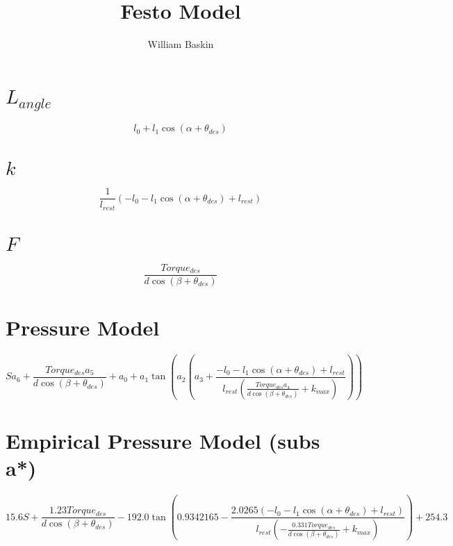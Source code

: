 \documentclass[12pt, letterpaper, oneside, notitlepage, onecolumn]{article}
\author{William Baskin}
\title{Festo Model}
\begin{document}
\maketitle

\section{$L_{angle}$}
\begin{equation}
l_{0} + l_{1} \cos{\left (\alpha + \theta_{des} \right )}
\end{equation}

\section{$k$}
\begin{equation}
\frac{1}{l_{rest}} \left(- l_{0} - l_{1} \cos{\left (\alpha + \theta_{des}
\right )} + l_{rest}\right)
\end{equation}

\section{$F$}
\begin{equation}
\frac{Torque_{des}}{d \cos{\left (\beta + \theta_{des} \right )}}
\end{equation}

\section{Pressure Model}
\begin{equation}
S a_{6} + \frac{Torque_{des} a_{5}}{d \cos{\left (\beta + \theta_{des} \right
)}} + a_{0} + a_{1} \tan{\left (a_{2} \left(a_{3} + \frac{- l_{0} - l_{1}
\cos{\left (\alpha + \theta_{des} \right )} + l_{rest}}{l_{rest}
\left(\frac{Torque_{des} a_{4}}{d \cos{\left (\beta + \theta_{des} \right )}} +
k_{max}\right)}\right) \right )}
\end{equation}

\section{Empirical Pressure Model (subs a*)}
\begin{equation}
15.6 S + \frac{1.23 Torque_{des}}{d \cos{\left (\beta + \theta_{des} \right )}}
- 192.0 \tan{\left (0.9342165 - \frac{2.0265 \left(- l_{0} - l_{1} \cos{\left
  (\alpha + \theta_{des} \right )} + l_{rest}\right)}{l_{rest} \left(-
  \frac{0.331 Torque_{des}}{d \cos{\left (\beta + \theta_{des} \right )}} +
  k_{max}\right)} \right )} + 254.3
  \end{equation}
\end{document}
